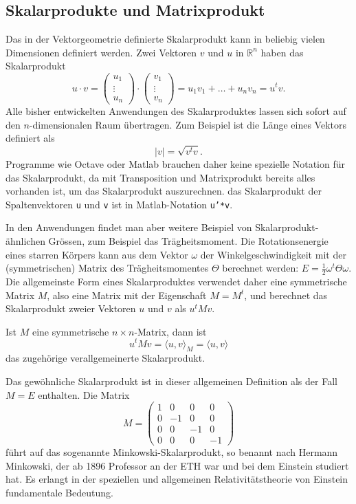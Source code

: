 %
%
\subsection{Skalarprodukte und Matrixprodukt}
Das in der Vektorgeometrie definierte Skalarprodukt kann in beliebig
vielen Dimensionen definiert werden.
Zwei Vektoren $v$ und $u$ in $\mathbb R^n$ haben
das Skalarprodukt
\[
u\cdot v=
\begin{pmatrix}u_1\\\vdots\\u_n\end{pmatrix}
\cdot
\begin{pmatrix}v_1\\\vdots\\v_n\end{pmatrix}
=u_1v_1+\dots+u_nv_n=u^tv.
\]
Alle bisher entwickelten Anwendungen des Skalarproduktes lassen sich sofort
auf den $n$-di\-men\-sio\-nalen Raum übertragen.
Zum Beispiel ist die Länge eines Vektors definiert als
\[
|v|=\sqrt{v^tv}.
\]
Programme wie Octave oder Matlab brauchen daher keine spezielle Notation
für das Skalarprodukt, da mit Transposition und Matrixprodukt
bereits alles vorhanden ist, um das Skalarprodukt auszurechnen.
das Skalarprodukt der Spaltenvektoren
\texttt{u}
und
\texttt{v}
ist in Matlab-Notation
\texttt{u'*v}.

In den Anwendungen findet man aber weitere Beispiel von
Skalarprodukt-ähnlichen Grössen, zum Beispiel das Trägheitsmoment.
Die Rotationsenergie eines starren Körpers kann aus dem Vektor $\omega$
der Winkelgeschwindigkeit mit der (symmetrischen) Matrix des
Trägheitsmomentes $\Theta$
berechnet werden:
$
E=\frac12 \omega^t\Theta \omega.
$
Die allgemeinste Form eines Skalarproduktes verwendet daher eine
symmetrische Matrix $M$, also eine Matrix mit der Eigenschaft
$M=M^t$, und berechnet das Skalarprodukt zweier Vektoren $u$ und $v$
als $u^tMv$.
\begin{definition}
Ist $M$ eine symmetrische $n\times n$-Matrix, dann ist
\[
u^t Mv
=
\langle u,v\rangle_M
=
\langle u,v\rangle
\]
das zugehörige verallgemeinerte Skalarprodukt.
\end{definition}
Das gewöhnliche Skalarprodukt ist in dieser allgemeinen Definition
als der Fall $M=E$ enthalten.
Die Matrix
\[
M=\begin{pmatrix}
1& 0& 0& 0\\
0&-1& 0& 0\\
0& 0&-1& 0\\
0& 0& 0&-1
\end{pmatrix}
\]
führt auf das sogenannte Minkowski-Skalarprodukt, so benannt nach
Hermann Minkowski, der ab 1896 Professor an der ETH war und bei dem
Einstein studiert hat.
Es erlangt in der speziellen und allgemeinen Relativitätstheorie von
Einstein fundamentale Bedeutung.

